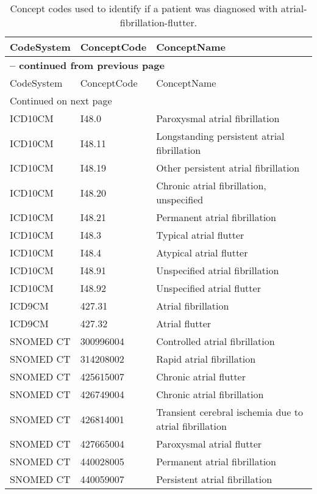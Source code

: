 \begin{longtable}{p{}p{}p{}}
\caption{Concept codes used to identify if a patient was diagnosed with atrial-fibrillation-flutter.} \\ 
 CodeSystem & ConceptCode & ConceptName \\ 
  \hline 
\endfirsthead 
\multicolumn{3}{p{\textwidth}}{{ \bfseries \tablename \thetable{} -- continued from previous page}} \\ 
\hline CodeSystem & ConceptCode & ConceptName \\ \hline 
\endhead 
\hline \multicolumn{3}{p{\textwidth}}{{Continued on next page}} \\ \hline 
\endfoot 
\hline 
\endlastfoot 
 \hline
ICD10CM & I48.0 & Paroxysmal atrial fibrillation \\ 
  ICD10CM & I48.11 & Longstanding persistent atrial fibrillation \\ 
  ICD10CM & I48.19 & Other persistent atrial fibrillation \\ 
  ICD10CM & I48.20 & Chronic atrial fibrillation, unspecified \\ 
  ICD10CM & I48.21 & Permanent atrial fibrillation \\ 
  ICD10CM & I48.3 & Typical atrial flutter \\ 
  ICD10CM & I48.4 & Atypical atrial flutter \\ 
  ICD10CM & I48.91 & Unspecified atrial fibrillation \\ 
  ICD10CM & I48.92 & Unspecified atrial flutter \\ 
  ICD9CM & 427.31 & Atrial fibrillation \\ 
  ICD9CM & 427.32 & Atrial flutter \\ 
  SNOMED CT & 300996004 & Controlled atrial fibrillation \\ 
  SNOMED CT & 314208002 & Rapid atrial fibrillation \\ 
  SNOMED CT & 425615007 & Chronic atrial flutter \\ 
  SNOMED CT & 426749004 & Chronic atrial fibrillation \\ 
  SNOMED CT & 426814001 & Transient cerebral ischemia due to atrial fibrillation \\ 
  SNOMED CT & 427665004 & Paroxysmal atrial flutter \\ 
  SNOMED CT & 440028005 & Permanent atrial fibrillation \\ 
  SNOMED CT & 440059007 & Persistent atrial fibrillation \\ 

\end{longtable}
